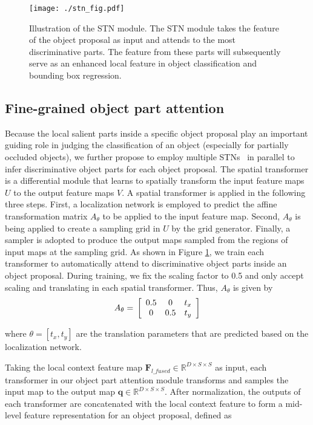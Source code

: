 \documentclass[journal]{IEEEtran}
\begin{document}
\begin{figure}
  \centering
  \texttt{[image: ./stn\_fig.pdf]}
  \caption{\label{fig:stn} Illustration of the STN module. The STN module takes the feature of the object proposal as input and attends to the most discriminative parts. The feature from these parts will subsequently serve as an enhanced local feature in object classification and bounding box regression.}
\end{figure}

\subsection{Fine-grained object part attention}
\label{sssec:local}
Because the local salient parts inside a specific object proposal play an important guiding role in judging the classification of an object (especially for partially occluded objects), we further propose to employ multiple STNs~\cite{jaderberg2015spatial} in parallel to infer discriminative object parts for each object proposal. The spatial transformer is a differential module that learns to spatially transform the input feature maps $U$ to the output feature maps $V$. A spatial transformer is applied in the following three steps. First, a localization network is employed to predict the affine transformation matrix $A_{\theta}$ to be applied to the input feature map. Second, $A_{\theta}$ is being applied to create a sampling grid in $U$ by the grid generator. Finally, a sampler is adopted to produce the output maps sampled from the regions of input maps at the sampling grid. As shown in Figure \ref{fig:stn}, we train each transformer to automatically attend to discriminative object parts inside an object proposal. During training, we fix the scaling factor to 0.5 and only accept scaling and translating in each spatial transformer. Thus, $A_{\theta}$ is given by
\begin{equation}
A_{\theta} = \\
\left[
	\begin{array}{ccc}
	0.5 & 0 & t_x \\
	0 & 0.5 & t_y \\
	\end{array}	
\right]
\end{equation}

where $\theta = [t_x, t_y]$ are the translation parameters that are predicted based on the localization network.

Taking the local context feature map $\bm{F}_{l\_fused} \in \mathbb{R}^{D \times S \times S}$ as input, each transformer in our object part attention module transforms and samples the input map to the output map $\bm{q} \in \mathbb{R}^{D \times S \times S}$. After normalization, the outputs of each transformer are concatenated with the local context feature to form a mid-level feature representation for an object proposal, defined as
\end{document}
